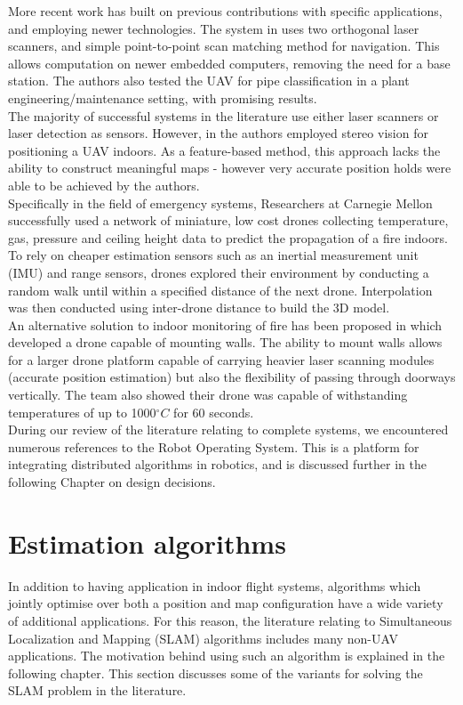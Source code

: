 \documentclass[capstone_report.tex]{subfiles}
\begin{document}
More recent work has built on previous contributions with specific applications, and employing newer technologies. The system in \cite{kumar} uses two orthogonal laser scanners, and simple point-to-point scan matching method for navigation. This allows computation on newer embedded computers, removing the need for a base station. The authors also tested the UAV for pipe classification in a plant engineering/maintenance setting, with promising results.\\

The majority of successful systems in the literature use either laser scanners or laser detection as sensors. However, in \cite{mustafah} the authors employed stereo vision for positioning a UAV indoors. As a feature-based method, this approach lacks the ability to construct meaningful maps - however very accurate position holds were able to be achieved by the authors.\\

Specifically in the field of emergency systems, Researchers at Carnegie Mellon \cite{sensorfly} successfully used a network of miniature, low cost drones collecting temperature, gas, pressure and ceiling height data to predict the propagation of a fire indoors.  To rely on cheaper estimation sensors such as an inertial measurement unit (IMU) and range sensors, drones explored their environment by conducting a random walk until within a specified distance of the next drone. Interpolation was then conducted using inter-drone distance to build the 3D model.\\

An alternative solution to indoor monitoring of fire has been proposed in \cite{myeong} which developed a drone capable of mounting walls.  The ability to mount walls allows for a larger drone platform capable of carrying heavier laser scanning modules (accurate position estimation) but also the flexibility of passing through doorways vertically.  The team also showed their drone was capable of withstanding temperatures of up to 1000$^\circ C$ for 60 seconds.\\

During our review of the literature relating to complete systems, we encountered numerous references to the Robot Operating System. This is a platform for integrating distributed algorithms in robotics, and is discussed further in the following Chapter on design decisions.

\section{Estimation algorithms}
In addition to having application in indoor flight systems, algorithms which jointly optimise over both a position and map configuration have a wide variety of additional applications. For this reason, the literature relating to Simultaneous Localization and Mapping (SLAM) algorithms includes many non-UAV applications. The motivation behind using such an algorithm is explained in the following chapter. This section discusses some of the variants for solving the SLAM problem in the literature.\\
\end{document}
